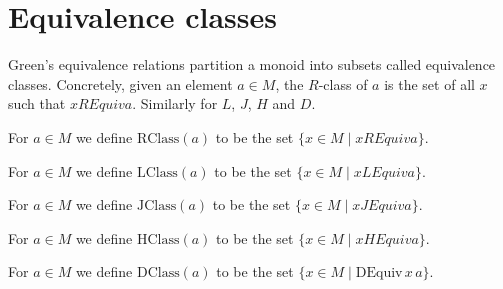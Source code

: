 \section{Equivalence classes}

Green's equivalence relations partition a monoid into subsets called equivalence classes.  Concretely, given an element \(a\in M\), the \(R\)-class of \(a\) is the set of all \(x\) such that \(x \mathrel{REquiv} a\).  Similarly for \(L\), \(J\), \(H\) and \(D\).

\begin{definition}
\label{def:RClass}
For \(a\in M\) we define \(\mathrm{RClass}(a)\) to be the set \(\{x\in M \mid x \mathrel{REquiv} a\}\).
\leanok
{}
\end{definition}

\begin{definition}
\label{def:LClass}
For \(a\in M\) we define \(\mathrm{LClass}(a)\) to be the set \(\{x\in M \mid x \mathrel{LEquiv} a\}\).
\leanok
{}
\end{definition}

\begin{definition}[J class]
\label{def:JClass}
For \(a\in M\) we define \(\mathrm{JClass}(a)\) to be the set \(\{x\in M \mid x \mathrel{JEquiv} a\}\).
\leanok
{}
\end{definition}

\begin{definition}[H class]
\label{def:HClass}
For \(a\in M\) we define \(\mathrm{HClass}(a)\) to be the set \(\{x\in M \mid x \mathrel{HEquiv} a\}\).
\leanok
{}
\end{definition}

\begin{definition}[D class]
\label{def:DClass}
For \(a\in M\) we define \(\mathrm{DClass}(a)\) to be the set \(\{x\in M \mid \mathrm{DEquiv}\,x\,a\}\).
\leanok
{}
\end{definition}
